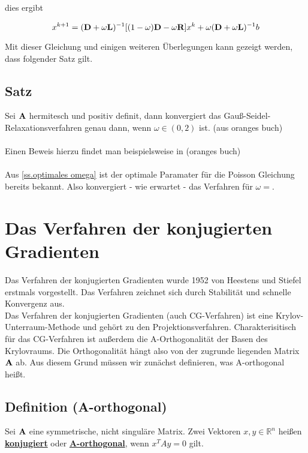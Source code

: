 dies ergibt

\begin{equation}
x^{k+1} = ({\textbf{D}}+\omega{\textbf{L}})^{-1}[(1-\omega){\textbf{D}}-\omega{\textbf{R}}]x^{k}+\omega({\textbf{D}}+\omega{\textbf{L}})^{-1}b
\end{equation}

Mit dieser Gleichung und einigen weiteren Überlegungen kann gezeigt werden, dass folgender Satz gilt.

\subsection{Satz}\label{ss.konvergenz für omega}

Sei ${\textbf{A}}$ hermitesch und positiv definit, dann konvergiert das Gauß-Seidel-Relaxationsverfahren genau dann, wenn $\omega \in (0,2)$ ist. (aus oranges buch) \\ \\

Einen Beweis hierzu findet man beispielsweise in (oranges buch) \\ \\

Aus \autoref{ss.optimales omega} ist der optimale Paramater für die Poisson Gleichung bereits bekannt. Also konvergiert - wie erwartet - das Verfahren für $\omega = $.

\section{Das Verfahren der konjugierten Gradienten}\label{s.Das Verfahren der konjugierten Gradienten}

Das Verfahren der konjugierten Gradienten wurde 1952 von Heestens und Stiefel erstmals vorgestellt. Das Verfahren zeichnet sich durch Stabilität und schnelle Konvergenz aus. \\
Das Verfahren der konjugierten Gradienten (auch CG-Verfahren) ist eine Krylov-Unterraum-Methode und gehört zu den Projektionsverfahren. Charakterisitisch für das CG-Verfahren ist außerdem die A-Orthogonalität der Basen des Krylovraums. Die Orthogonalität hängt also von der zugrunde liegenden Matrix ${\textbf{A}}$ ab. Aus diesem Grund müssen wir zunächst definieren, was A-orthogonal heißt.

\subsection{Definition (A-orthogonal)}\label{ss.A-orthogonal}
Sei ${\textbf{A}}$ eine symmetrische, nicht singuläre Matrix. Zwei Vektoren $x,y \in \mathbb{R}^{n}$ heißen \underline{\textbf{konjugiert}} oder \underline{\textbf{A-orthogonal}}, wenn $x^{T}Ay = 0$ gilt.


